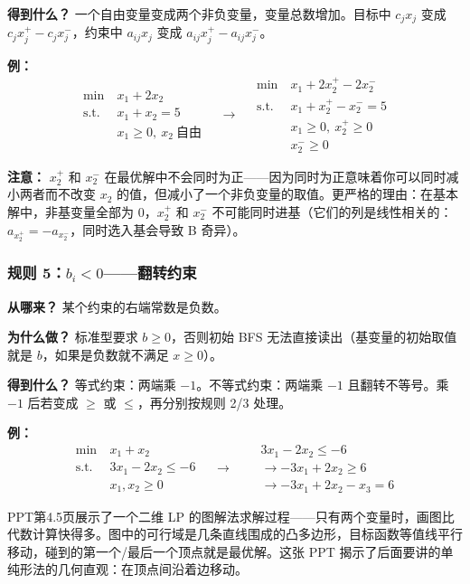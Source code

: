 {\textbf{得到什么？} 一个自由变量变成两个非负变量，变量总数增加。目标中 $c_j x_j$ 变成 $c_j x_j^+ - c_j x_j^-$，约束中 $a_{ij}x_j$ 变成 $a_{ij}x_j^+ - a_{ij}x_j^-$。

\textbf{例：}
\[
\begin{aligned}
\min\ & x_1 + 2x_2 \\
\text{s.t.}\ & x_1 + x_2 = 5 \\
& x_1 \ge 0,\ x_2\ \text{自由}
\end{aligned}
\quad\longrightarrow\quad
\begin{aligned}
\min\ & x_1 + 2x_2^+ - 2x_2^- \\
\text{s.t.}\ & x_1 + x_2^+ - x_2^- = 5 \\
& x_1 \ge 0,\ x_2^+ \ge 0 \\
& x_2^- \ge 0
\end{aligned}
\]

\textbf{注意：} $x_2^+$ 和 $x_2^-$ 在最优解中不会同时为正——因为同时为正意味着你可以同时减小两者而不改变 $x_2$ 的值，但减小了一个非负变量的取值。更严格的理由：在基本解中，非基变量全部为 0，$x_2^+$ 和 $x_2^-$ 不可能同时进基（它们的列是线性相关的：$a_{x_2^+} = -a_{x_2^-}$，同时选入基会导致 B 奇异）。

\subsubsection{规则 5：$b_i < 0$——翻转约束}

\textbf{从哪来？} 某个约束的右端常数是负数。

\textbf{为什么做？} 标准型要求 $b\ge 0$，否则初始 BFS 无法直接读出（基变量的初始取值就是 $b$，如果是负数就不满足 $x\ge 0$）。

\textbf{得到什么？} 等式约束：两端乘 $-1$。不等式约束：两端乘 $-1$ 且翻转不等号。乘 $-1$ 后若变成 $\ge$ 或 $\le$，再分别按规则 2/3 处理。

\textbf{例：}
{\small
\[
\begin{aligned}
\min\ & x_1 + x_2 \\
\text{s.t.}\ & 3x_1 - 2x_2 \le -6 \\
& x_1, x_2 \ge 0
\end{aligned}
\quad\longrightarrow\quad
\begin{aligned}
& 3x_1 - 2x_2 \le -6 \\
&\to -3x_1 + 2x_2 \ge 6 \\
&\to -3x_1 + 2x_2 - x_3 = 6
\end{aligned}
\]
}}

PPT第4.5页展示了一个二维 LP 的图解法求解过程——只有两个变量时，画图比代数计算快得多。图中的可行域是几条直线围成的凸多边形，目标函数等值线平行移动，碰到的第一个/最后一个顶点就是最优解。这张 PPT 揭示了后面要讲的单纯形法的几何直观：在顶点间沿着边移动。

